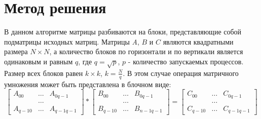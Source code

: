 \documentclass{report}
\begin{document}
\newpage

\section*{Метод решения}
В данном алгоритме матрицы разбиваются на блоки, представляющие собой подматрицы исходных матриц. Матрицы {\itshape A}, {\itshape $B$} и {\itshape $C$} являются квадратными размера {\itshape $N  \times N$}, а количество блоков по горизонтали и по вертикали является одинаковым и равным {\itshape $q$}, где  {\itshape $q = \sqrt p$}, {\itshape $p$} - количество запускаемых процессов. Размер всех блоков равен {\itshape $k \times k$}, {\itshape $k = \frac{N}{q} $}. В этом случае операция матричного умножения может быть представлена в блочном виде:
$$
\begin{bmatrix}
A_{00}&  \ldots & A_{0q-1}\\
& \ldots\\
A_{q-10}& \ldots & A_{q-1q-1}
\end{bmatrix}
*
\begin{bmatrix}
B_{0 0}& \ldots & B_{0 q-1}\\
& \ldots\\
B_{q-1 0}& \ldots & B_{n-1 q-1}
\end{bmatrix}
=
\begin{bmatrix}
C_{0 0}& \ldots & C_{0q-1}\\
&\ldots\\
C_{q-1 0}& \ldots & C_{q-1 q-1}
\end{bmatrix}
$$
\end{document}
